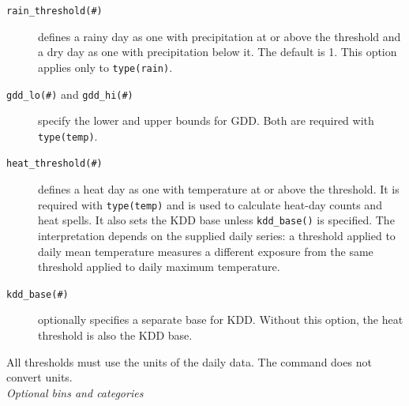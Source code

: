 \begin{description}
	\item[\texttt{rain\_threshold(\#)}] defines a rainy day as one with precipitation at or above the threshold and a dry day as one with precipitation below it. The default is 1. This option applies only to \texttt{type(rain)}.
	\item[\texttt{gdd\_lo(\#)} and \texttt{gdd\_hi(\#)}] specify the lower and upper bounds for GDD. Both are required with \texttt{type(temp)}.
	\item[\texttt{heat\_threshold(\#)}] defines a heat day as one with temperature at or above the threshold. It is required with \texttt{type(temp)} and is used to calculate heat-day counts and heat spells. It also sets the KDD base unless \texttt{kdd\_base()} is specified. The interpretation depends on the supplied daily series: a threshold applied to daily mean temperature measures a different exposure from the same threshold applied to daily maximum temperature.
	\item[\texttt{kdd\_base(\#)}] optionally specifies a separate base for KDD. Without this option, the heat threshold is also the KDD base.
\end{description}

\noindent All thresholds must use the units of the daily data. The command does not convert units. \\

\noindent\textit{Optional bins and categories}

